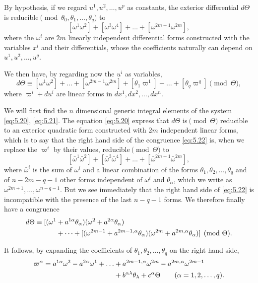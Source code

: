 \documentclass[leqno,11pt]{book}
\numberwithin{equation}{chapter}
\theoremstyle{shape1}
\theoremstyle{shape0}
\theoremstyle{shape2}
\theoremstyle{definition}
\begin{document}
By hypothesis, if we regard $u^{1},u^{2},\dots,u^{p}$ as constants, the exterior differential $d\Theta$ is reducible$\pmod{\theta_{0},\theta_{1},\dots,\theta_{q}}$ to
\[
[\omega^{1}\omega^{2}]+[\omega^{3}\omega^{4}]+\dots+[\omega^{2m-1}\omega^{2m}],
\]
where the $\omega^{i}$ are $2m$ linearly independent differential forms constructed with the variables $x^{i}$ and their differentials, whose the coefficients naturally can depend on $u^{1},u^{2},\dots,u^{q}$.

We then have, by regarding now the $u^{i}$ as variables,
\begin{equation}
  \label{eq:5.22}
  d\Theta\equiv[\omega^{1}\omega^{2}]+\dots+[\omega^{2m-1}\omega^{2m}]+[\theta_{1}\varpi^{1}]+\dots+[\theta_{q}\varpi^{q}]\pmod{\Theta},
\end{equation}
where $\varpi^{i}+du^{i}$ are linear forms in $dx^{1},dx^{2},\dots,dx^{n}$.



\vspace{12pt}\fsec We will first find the $n$ dimensional generic integral elements of the system \eqref{eq:5.20}, \eqref{eq:5.21}. The equation \eqref{eq:5.20} express that $d\Theta$ is$\pmod{\Theta}$ reducible to an exterior quadratic form constructed with $2m$ independent linear forms, which is to say that the right hand side of the congruence \eqref{eq:5.22} is, when we replace the $\varpi^{i}$ by their values, reducible$\pmod{\Theta}$ to
\[
[\bar\omega^{1}\bar\omega^{2}]+[\bar\omega^{3}\bar\omega^{4}]+\dots+[\bar\omega^{2m-1}\bar\omega^{2m}],
\]  
where $\bar\omega^{i}$ is the sum of $\omega^{i}$ and a linear combination of the forms $\theta_{1},\theta_{2},\dots, \theta_{q}$ and of $n-2m-q-1$ other forms independent of $\omega^{i}$ and $\theta_{\alpha}$, which we write as $\omega^{2m+1},\dots,\omega^{n-q-1}$. But we see immediately that the right hand side of \eqref{eq:5.22} is incompatible with the presence of the last $n-q-1$ forms. We therefore finally have a congruence
\begin{align}
  \label{eq:5.23}
  d\Theta\equiv[(\omega^{1}&+a^{1\alpha}\theta_{\alpha})(\omega^{2}+a^{2\alpha}\theta_{\alpha})\\
  &+\dots+[(\omega^{2m-1}+a^{2m-1,\alpha}\theta_{\alpha})(\omega^{2m}+a^{2m,\alpha}\theta_{\alpha})]\pmod{\Theta}.\notag
\end{align}

It follows, by expanding the coefficients of $\theta_{1},\theta_{2},\dots,\theta_{q}$ on the right hand side,
\begin{align}
  \label{eq:5.24}
  \varpi^{\alpha}=a^{1\alpha}\omega^{2}-a^{2\alpha}\omega^{1}+\dots&+a^{2m-1,\alpha}\omega^{2m}-a^{2m,\alpha}\omega^{2m-1}\\
  &+b^{\alpha\lambda}\theta_{\lambda}+c^{\alpha}\Theta\qquad(\alpha=1,2,\dots,q).\notag
\end{align}
\end{document}
